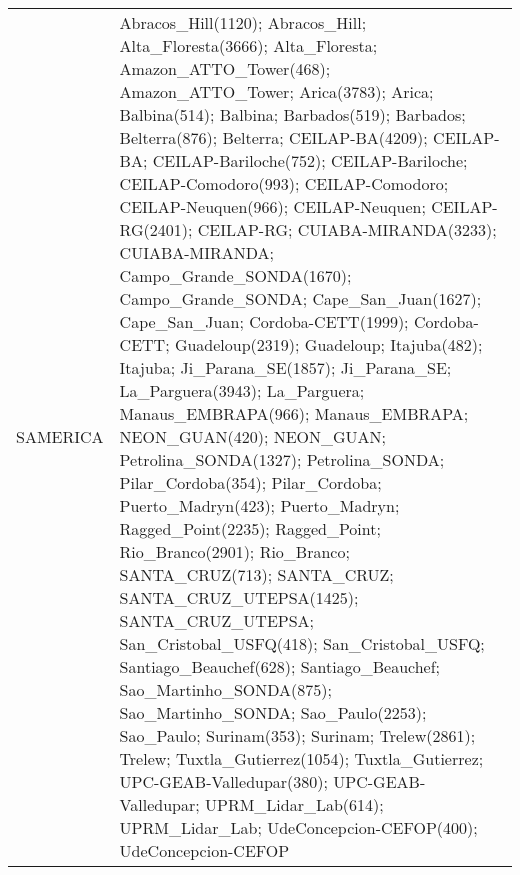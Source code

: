 \documentclass[journal abbreviation, manuscript]{copernicus}
\begin{document}
\begin{table}
\begin{tabularx}{\textwidth}{lX}
  SAMERICA  & Abracos\_Hill(1120); Abracos\_Hill; Alta\_Floresta(3666); Alta\_Floresta; Amazon\_ATTO\_Tower(468); Amazon\_ATTO\_Tower; Arica(3783); Arica; Balbina(514); Balbina; Barbados(519); Barbados; Belterra(876); Belterra; CEILAP-BA(4209); CEILAP-BA; CEILAP-Bariloche(752); CEILAP-Bariloche; CEILAP-Comodoro(993); CEILAP-Comodoro; CEILAP-Neuquen(966); CEILAP-Neuquen; CEILAP-RG(2401); CEILAP-RG; CUIABA-MIRANDA(3233); CUIABA-MIRANDA; Campo\_Grande\_SONDA(1670); Campo\_Grande\_SONDA; Cape\_San\_Juan(1627); Cape\_San\_Juan; Cordoba-CETT(1999); Cordoba-CETT; Guadeloup(2319); Guadeloup; Itajuba(482); Itajuba; Ji\_Parana\_SE(1857); Ji\_Parana\_SE; La\_Parguera(3943); La\_Parguera; Manaus\_EMBRAPA(966); Manaus\_EMBRAPA; NEON\_GUAN(420); NEON\_GUAN; Petrolina\_SONDA(1327); Petrolina\_SONDA; Pilar\_Cordoba(354); Pilar\_Cordoba; Puerto\_Madryn(423); Puerto\_Madryn; Ragged\_Point(2235); Ragged\_Point; Rio\_Branco(2901); Rio\_Branco; SANTA\_CRUZ(713); SANTA\_CRUZ; SANTA\_CRUZ\_UTEPSA(1425); SANTA\_CRUZ\_UTEPSA; San\_Cristobal\_USFQ(418); San\_Cristobal\_USFQ; Santiago\_Beauchef(628); Santiago\_Beauchef; Sao\_Martinho\_SONDA(875); Sao\_Martinho\_SONDA; Sao\_Paulo(2253); Sao\_Paulo; Surinam(353); Surinam; Trelew(2861); Trelew; Tuxtla\_Gutierrez(1054); Tuxtla\_Gutierrez; UPC-GEAB-Valledupar(380); UPC-GEAB-Valledupar; UPRM\_Lidar\_Lab(614); UPRM\_Lidar\_Lab; UdeConcepcion-CEFOP(400); UdeConcepcion-CEFOP                                                                                                                                                                                                                                                                                                                                                                                                                                                                                                                                                                                                                                                                                                                                                                                                                                                                                                                                                                                                                                                                                                                                                                                                                                                                                                                                                                                                                                                                                                                                                                                                                                                                                                                                                                                                                                                                                                                                                     
\end{tabularx}
\end{table}
\end{document}
